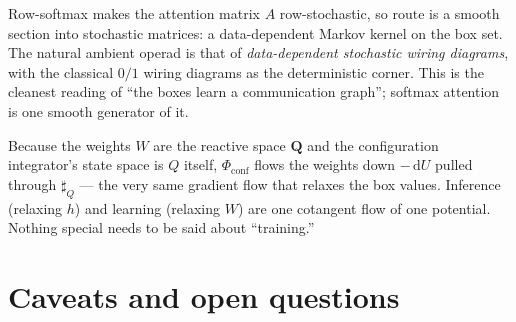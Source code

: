 \documentclass[11pt]{article}
\theoremstyle{plain}
\theoremstyle{definition}
\theoremstyle{remark}
\newcommand{\rv}[1]{\mathbf{#1}}         %
\newcommand{\sharpR}{\sharp}
\newcommand{\conf}{\mathrm{conf}}
\newcommand{\Phiconf}{\Phi_{\conf}}
\begin{document}
\begin{remark}\label{rmk.stoch}
Row-softmax makes the attention matrix $A$ row-stochastic, so
$\mathrm{route}$ is a smooth section into stochastic matrices: a
data-dependent Markov kernel on the box set. The natural ambient operad is
that of \emph{data-dependent stochastic wiring diagrams}, with the
classical $0/1$ wiring diagrams as the deterministic corner. This is the
cleanest reading of ``the boxes learn a communication graph''; softmax
attention is one smooth generator of it.
\end{remark}

\begin{remark}\label{rmk.params}
Because the weights $W$ are the reactive space $\rv Q$ and the
configuration integrator's state space is $Q$ itself, $\Phiconf$ flows the
weights down $-\,\mathrm dU$ pulled through $\sharpR_Q$ --- the very same
gradient flow that relaxes the box values. Inference (relaxing $h$) and
learning (relaxing $W$) are one cotangent flow of one potential. Nothing
special needs to be said about ``training.''
\end{remark}

\section{Caveats and open questions}\label{sec.open}
\end{document}
